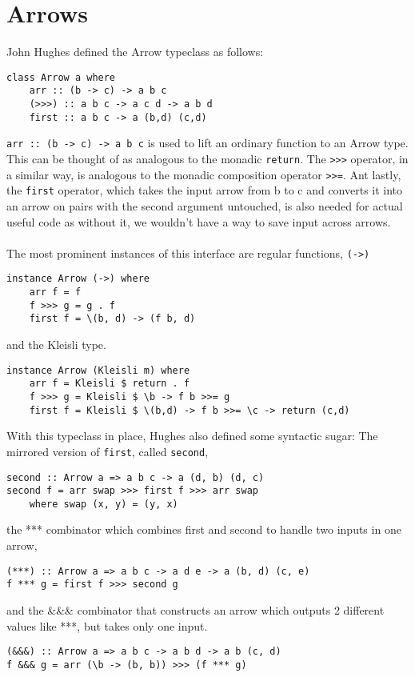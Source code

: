 \section{Arrows}

John Hughes defined the Arrow typeclass as follows\citHughes:
\begin{lstlisting}[frame=htrbl]
class Arrow a where
	arr :: (b -> c) -> a b c
	(>>>) :: a b c -> a c d -> a b d
	first :: a b c -> a (b,d) (c,d)
\end{lstlisting}
\lstinline{arr :: (b -> c) -> a b c} is used to lift an ordinary function to an Arrow type. This can be thought of as analogous to the monadic \lstinline{return}. The \lstinline{>>>} operator, in a similar way, is analogous to the monadic composition operator \lstinline{>>=}. Ant lastly, the \lstinline{first} operator, which takes the input arrow from b to c and converts it into an arrow on pairs with the second argument untouched, is also needed for actual useful code as without it, we wouldn't have a way to save input across arrows.
\\\\
The most prominent instances of this interface are regular functions, \lstinline{(->)}
\begin{lstlisting}[frame=htrbl]
instance Arrow (->) where
	arr f = f
	f >>> g = g . f
	first f = \(b, d) -> (f b, d) 
\end{lstlisting}
and the Kleisli type.
\begin{lstlisting}[frame=htrbl]
instance Arrow (Kleisli m) where
	arr f = Kleisli $ return . f
	f >>> g = Kleisli $ \b -> f b >>= g
	first f = Kleisli $ \(b,d) -> f b >>= \c -> return (c,d)
\end{lstlisting}
With this typeclass in place, Hughes also defined some syntactic sugar: The mirrored version of \lstinline{first}, called \lstinline{second},
\begin{lstlisting}[frame=htrbl]
second :: Arrow a => a b c -> a (d, b) (d, c)
second f = arr swap >>> first f >>> arr swap
	where swap (x, y) = (y, x)
\end{lstlisting}
the *** combinator which combines first and second to handle two inputs in one arrow,
\begin{lstlisting}[frame=htrbl]
(***) :: Arrow a => a b c -> a d e -> a (b, d) (c, e)
f *** g = first f >>> second g
\end{lstlisting}
and the \&\&\& combinator that constructs an arrow which outputs 2 different values like ***, but takes only one input.
\begin{lstlisting}[frame=htrbl]
(&&&) :: Arrow a => a b c -> a b d -> a b (c, d)
f &&& g = arr (\b -> (b, b)) >>> (f *** g)
\end{lstlisting}
